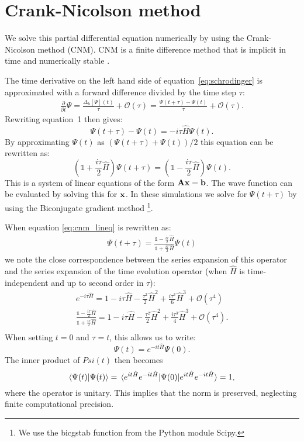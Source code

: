 \section{Crank-Nicolson method}
We solve this partial differential equation numerically by using the Crank-Nicolson method (CNM). CNM is a finite difference method that is implicit in time and numerically stable \cite{cnm}. 

The time derivative on the left hand side of equation~\ref{eq:schrodinger} is approximated with a forward difference divided by the time step $\tau$:
\begin{gather*}
    \frac{\partial}{\partial t}\Psi 
    = \frac{\Delta_h[\Psi](t)}{\tau} + \mathcal{O}(\tau)
    = \frac{\Psi(t + \tau) - \Psi(t)}{\tau} + \mathcal{O}(\tau).
\end{gather*} Rewriting equation~1 then gives:
\[
    \Psi(t+\tau)-\Psi(t) 
    = -i\tau\hat{H}\Psi(t).
\] By approximating $\Psi(t)$ as $\left(\Psi(t+\tau)+\Psi(t)\right)/2$ this equation can be rewritten as:
\begin{equation}\label{eq:cnm_lineq}
    \left(\mathbb{1}+\frac{i\tau}{2}\hat{H}\right)\Psi(t+\tau) 
    = \left(\mathbb{1}-\frac{i\tau}{2}\hat{H}\right)\Psi(t).
\end{equation} This is a system of linear equations of the form $\mathbf{A}\vb{x}=\vb{b}$. The wave function can be evaluated by solving this for $\vb{x}$. In these simulations we solve for $\Psi(t+\tau)$ by using the Biconjugate gradient method \footnote{We use the bicgstab function from the Python module Scipy.}.

When equation \ref{eq:cnm_lineq} is rewritten as:
\begin{gather*}
\Psi(t+\tau) 
    = \frac{\mathbb{1}-\frac{i\tau}{2}\hat{H}}{\mathbb{1}+\frac{i\tau}{2}\hat{H}}\Psi(t)
\end{gather*} we note the close correspondence between the series expansion of this operator and the series expansion of the time evolution operator (when $\hat{H}$ is time-independent and up to second order in $\tau$):
\begin{gather*}
    e^{-i\tau\hat{H}} 
    = 1 - i \tau\hat{H} - \frac{\tau^2}{2}\hat{H}^2 + \frac{i\tau^3}{6}\hat{H}^3 + \mathcal{O}(\tau^4)\\
    \frac{\mathbb{1}-\frac{i\tau}{2}\hat{H}}{\mathbb{1}+\frac{i\tau}{2}\hat{H}} 
    = 1 - i \tau\hat{H} - \frac{\tau^2}{2}\hat{H}^2 + \frac{i\tau^3}{4}\hat{H}^3 + \mathcal{O}(\tau^4).\\
\end{gather*}
When setting $t=0$ and $\tau=t$, this allows us to write:
\[
    \Psi(t)
    = e^{-it \hat{H}} \Psi(0).
\] The inner product of $Psi(t)$ then becomes
\[
    \braket{\Psi(t)}{\Psi(t)}
    = \ev*{\Psi(0)}{e^{it\hat{H}} e^{-it\hat{H}}}
    = 1,
\] where the operator is unitary. This implies that the norm is preserved, neglecting finite computational precision.

